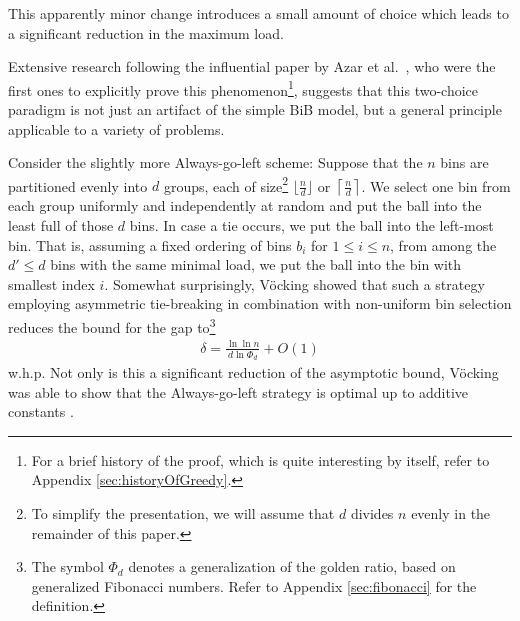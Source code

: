 \documentclass[a4paper,12pt]{article}
\begin{document}
This apparently minor change introduces a small amount of choice which leads to a significant reduction in the maximum load. 
\begin{comment}
Curiously, the exponential decrease in the gap is already achieved having just two choices (that is, $d=2$). Each additional choice decreases the bound for the maximum gap by just a constant factor~\cite{MRS01}. 
\end{comment}
Extensive research following the influential paper by Azar et al.~\cite{ABKU99}, who were the first ones to explicitly prove this phenomenon\footnote{For a brief history of the proof, which is quite interesting by itself, refer to Appendix \ref{sec:historyOfGreedy}.}, suggests that this two-choice paradigm is not just an artifact of the simple BiB model, but a general principle applicable to a variety of problems. 

Consider the slightly more Always-go-left scheme: Suppose that the $n$ bins are partitioned evenly into $d$ groups, each of size\footnote{To simplify the presentation, we will assume that $d$ divides $n$ evenly in the remainder of this paper.} $\lfloor \frac{n}{d}\rfloor$ or $\left\lceil\frac{n}{d}\right\rceil$. We select one bin from each group uniformly and independently at random and put the ball into the least full of those $d$ bins. In case a tie occurs, we put the ball into the left-most bin. That is, assuming a fixed ordering of bins $b_i$ for $1 \leq i \leq n$, from among the $d' \leq d$ bins with the same minimal load, we put the ball into the bin with smallest index $i$. Somewhat surprisingly, V\"ocking \cite{VOC03} showed that such a strategy employing asymmetric tie-breaking in combination with non-uniform bin selection reduces the bound for the gap to\footnote{The symbol $\Phi_d$ denotes a generalization of the golden ratio, based on generalized Fibonacci numbers. Refer to Appendix \ref{sec:fibonacci} for the definition.}
\begin{align*}
\delta = \frac{\ln\ln n}{d  \ln \Phi_d} + O(1)
\end{align*}
w.h.p. Not only is this a significant reduction of the asymptotic bound, V\"ocking was able to show that the Always-go-left strategy is optimal up to additive constants \cite{VOC03}.
\end{document}
